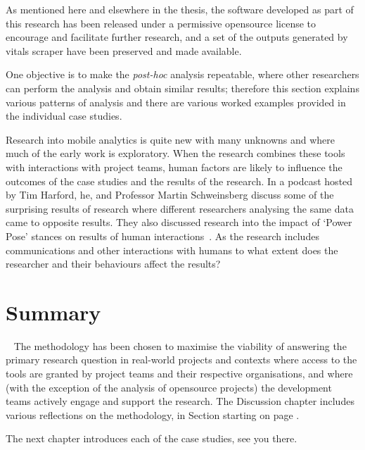 As mentioned here and elsewhere in the thesis, the software developed as part of this research has been released under a permissive opensource license to encourage and facilitate further research, and a set of the outputs generated by vitals scraper have been preserved and made available.

One objective is to make the \emph{post-hoc} analysis repeatable, where other researchers can perform the analysis and obtain similar results; therefore this section explains various patterns of analysis and there are various worked examples provided in the individual case studies.

Research into mobile analytics is quite new with many unknowns and where much of the early work is exploratory. When the research combines these tools with interactions with project teams, human factors are likely to influence the outcomes of the case studies and the results of the research. In a podcast hosted by Tim Harford, he, and Professor Martin Schweinsberg discuss some of the surprising results of research where different researchers analysing the same data came to opposite results. They also discussed research into the impact of `Power Pose' stances on results of human interactions~\citep{harford2021_more_or_less_same_data_opposite_results_can_we_trust_research}. As the research includes communications and other interactions with humans to what extent does the researcher and their behaviours affect the results?


\section[Summary of the methodology chapter]{Summary}~\label{methodology-summary-section}
The methodology has been chosen to maximise the viability of answering the primary research question in real-world projects and contexts where access to the tools are granted by project teams and their respective organisations, and where (with the exception of the analysis of opensource projects) the development teams actively engage and support the research. The Discussion chapter includes various reflections on the methodology, in Section  starting on page \pageref{discussion-on-methodology-and-case-study-procedure}.

The next chapter introduces each of the case studies, see you there.